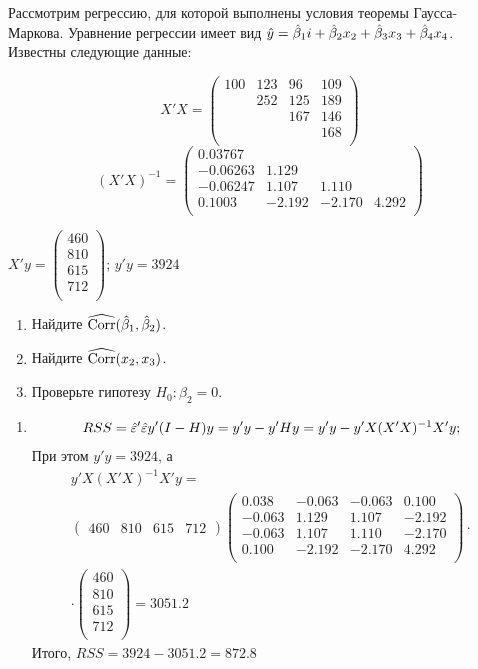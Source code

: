 \begin{problem}
Рассмотрим регрессию, для которой выполнены условия теоремы Гаусса-Маркова. Уравнение регрессии имеет вид $\hat{y} = \hat{\beta}_1 i + \hat{\beta}_2 x_2 + \hat{\beta}_3 x_3 + \hat{\beta}_4 x_4$. Известны следующие данные:

\[
X' X = \begin{pmatrix}
100 & 123 & 96 & 109 \\
 & 252 & 125 & 189 \\
 & & 167 & 146 \\
 & & & 168 \\
\end{pmatrix}
\]
\[
(X'X)^{-1} = \begin{pmatrix}
0.03767 & & & \\
-0.06263 & 1.129 & & \\
-0.06247 & 1.107 & 1.110 & \\
0.1003 & -2.192 & -2.170 & 4.292 \\
\end{pmatrix}
\]

$X'y = \begin{pmatrix}
460\\
810\\
615\\
712\\
\end{pmatrix}$; $y'y = 3924$

\begin{enumerate}
\item Найдите $\widehat{\operatorname{Corr}}(\hat{\beta}_1, \hat{\beta}_2)$.
\item Найдите $\widehat{\operatorname{Corr}}(x_2, x_3)$.
\item Проверьте гипотезу $H_0: \beta_2 = 0$.
\end{enumerate}


\begin{sol}
\begin{enumerate}
\item
\begin{multline*}
RSS = \hat{\varepsilon}'\hat{\varepsilon} y' (I - H) y = y' y - y'Hy = y'y - y' X(X'X)^{-1}X'y ;
\end{multline*}
При этом $y'y=3924$,  а
\begin{multline*}
y' X(X'X)^{-1}X'y= \\
 \begin{pmatrix}
460 & 810 & 615 & 712
\end{pmatrix} \begin{pmatrix}
0.038 & -0.063 & -0.063 & 0.100 \\
-0.063 & 1.129 & 1.107 & -2.192 \\
-0.063 & 1.107 & 1.110 & -2.170 \\
0.100 & -2.192 & -2.170 & 4.292 \\
\end{pmatrix} \cdot \\
\cdot
\begin{pmatrix}
460\\
810\\
615\\
712\\
\end{pmatrix} = 3051.2
\end{multline*}
Итого, $RSS= 3924 - 3051.2 = 872.8$


\end{enumerate}
\end{sol}
\end{problem}
